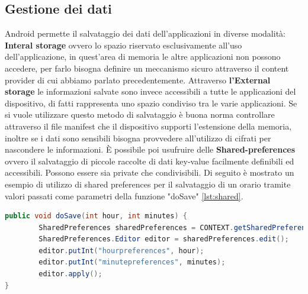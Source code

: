 \subsection{Gestione dei dati}
Android permette il salvataggio dei dati dell'applicazioni in diverse modalità: \textbf{Interal storage} ovvero lo spazio riservato esclusivamente all'uso dell'applicazione, in quest'area di memoria le altre applicazioni non possono accedere, per farlo bisogna definire un meccanismo sicuro attraverso il content provider di cui abbiamo parlato precedentemente. Attraverso \textbf{l'External storage} le informazioni salvate sono invece accessibili a tutte le applicazioni del dispositivo, di fatti rappresenta uno spazio condiviso tra le varie applicazioni. Se si vuole utilizzare questo metodo di salvataggio è buona norma controllare attraverso il file manifest che il dispositivo supporti l'estensione della memoria, inoltre se i dati sono sensibili bisogna provvedere all'utilizzo di cifrati per nascondere le informazioni. È possibile poi usufruire delle \textbf{Shared-preferences} ovvero il salvataggio di piccole raccolte di dati key-value facilmente definibili ed accessibili. Possono essere sia private che condivisibili. Di seguito è mostrato un esempio di utilizzo di shared preferences per il salvataggio di un orario tramite valori passati come parametri della funzione "doSave" \ref{lst:shared}. 
\begin{lstlisting}[language=Java, caption=Shared Preference example, label= lst:shared]
public void doSave(int hour, int minutes) {
        SharedPreferences sharedPreferences = CONTEXT.getSharedPreferences("DispensaSetting", Context.MODE_PRIVATE);
        SharedPreferences.Editor editor = sharedPreferences.edit();
        editor.putInt("hourpreferences", hour);
        editor.putInt("minutepreferences", minutes);
        editor.apply();
}
\end{lstlisting}

